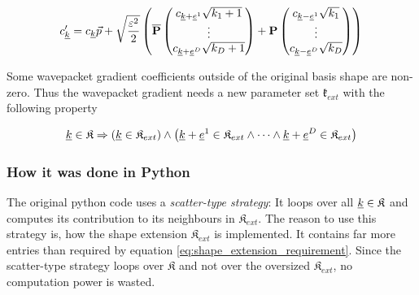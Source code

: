 \documentclass{article}
\begin{document}
\begin{equation}
  \label{eq:compute_grad_coeff}
  c'_{\underline{k}}=c_{\underline{k}}\vec{p}+\sqrt{\frac{\varepsilon^2}{2}}
  \left(\mathbf{\overline{P}}
    \begin{pmatrix}
      c_{\underline{k}+\underline{e}^1}\sqrt{k_1+1} \\
      \vdots \\
      c_{\underline{k}+\underline{e}^D}\sqrt{k_D+1} \\
    \end{pmatrix}
    +\mathbf{P}
    \begin{pmatrix}
      c_{\underline{k}-\underline{e}^1}\sqrt{k_1} \\
      \vdots \\
      c_{\underline{k}-\underline{e}^D}\sqrt{k_D} \\
    \end{pmatrix}
  \right)
\end{equation}

Some wavepacket gradient coefficients outside of the original basis shape are non-zero.
Thus the wavepacket gradient needs a new parameter set \(\mathfrak{k}_{ext}\)
with the following property

\begin{equation}
  \label{eq:shape_extension_requirement}
  \underline{k} \in \mathfrak{K} \Rightarrow
  \left(
     \underline{k} \in \mathfrak{K}_{ext}
  \right)
  \wedge
  \left(
    \underline{k}+\underline{e}^1 \in \mathfrak{K}_{ext}
    \wedge \dots \wedge
    \underline{k}+\underline{e}^D \in \mathfrak{K}_{ext}
  \right)
\end{equation}

\subsubsection{How it was done in Python}
The original python code uses a \emph{scatter-type strategy}:
It loops over all \(\underline{k} \in \mathfrak{K}\) and computes its contribution
to its neighbours in \(\mathfrak{K}_{ext}\). The reason to use this strategy is,
how the shape extension \(\mathfrak{K}_{ext}\) is implemented. It contains far more
entries than required by equation \eqref{eq:shape_extension_requirement}.
Since the scatter-type strategy loops over \(\mathfrak{K}\) and
not over the oversized \(\mathfrak{K}_{ext}\), no computation power is wasted.
\end{document}
